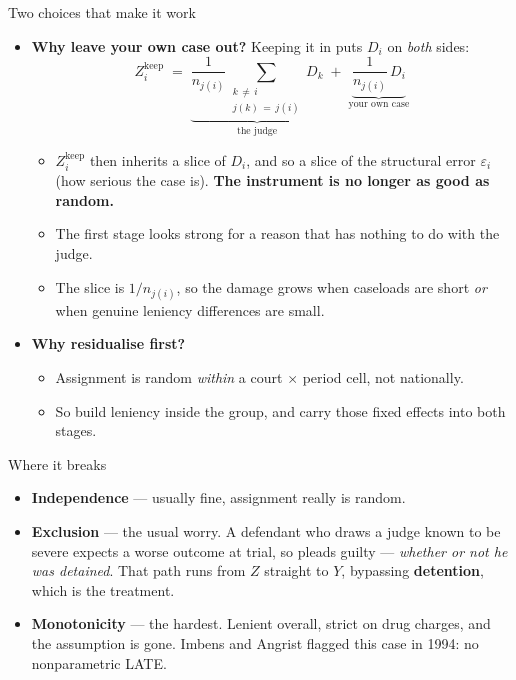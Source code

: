 \documentclass[
  11pt,
  ignorenonframetext,
  aspectratio=169,
]{beamer}
\providecommand{\tightlist}{%
  \setlength{\itemsep}{0pt}\setlength{\parskip}{0pt}}
\begin{document}
\begin{frame}{Two choices that make it work}
\protect{}\label{two-choices-that-make-it-work}
\begin{itemize}
\tightlist
\item
  \textbf{Why leave your own case out?} Keeping it in puts \(D_i\) on
  \emph{both} sides: \[
  Z_i^{\text{keep}} \;=\; \underbrace{\frac{1}{n_{j(i)}} \sum_{\substack{k \,\neq\, i \\ j(k) \,=\, j(i)}} D_k}_{\text{the judge}} \;+\; \underbrace{\frac{1}{n_{j(i)}}\, D_i}_{\text{your own case}}
  \]

  \begin{itemize}
  \tightlist
  \item
    \(Z_i^{\text{keep}}\) then inherits a slice of \(D_i\), and so a
    slice of the structural error \(\varepsilon_i\) (how serious the
    case is). \textbf{The instrument is no longer as good as random.}
  \item
    The first stage looks strong for a reason that has nothing to do
    with the judge.
  \item
    The slice is \(1/n_{j(i)}\), so the damage grows when caseloads are
    short \emph{or} when genuine leniency differences are small.
  \end{itemize}
\item
  \textbf{Why residualise first?}

  \begin{itemize}
  \tightlist
  \item
    Assignment is random \emph{within} a court \(\times\) period cell,
    not nationally.
  \item
    So build leniency inside the group, and carry those fixed effects
    into both stages.
  \end{itemize}
\end{itemize}
\end{frame}

\begin{frame}{Where it breaks}
\protect{}\label{where-it-breaks}
\begin{itemize}
\tightlist
\item
  \textbf{Independence} --- usually fine, assignment really is random.
\item
  \textbf{Exclusion} --- the usual worry. A defendant who draws a judge
  known to be severe expects a worse outcome at trial, so pleads guilty
  --- \emph{whether or not he was detained}. That path runs from \(Z\)
  straight to \(Y\), bypassing \textbf{detention}, which is the
  treatment.
\item
  \textbf{Monotonicity} --- the hardest. Lenient overall, strict on drug
  charges, and the assumption is gone. Imbens and Angrist flagged this
  case in 1994: no nonparametric LATE.
\end{itemize}
\end{frame}
\end{document}
